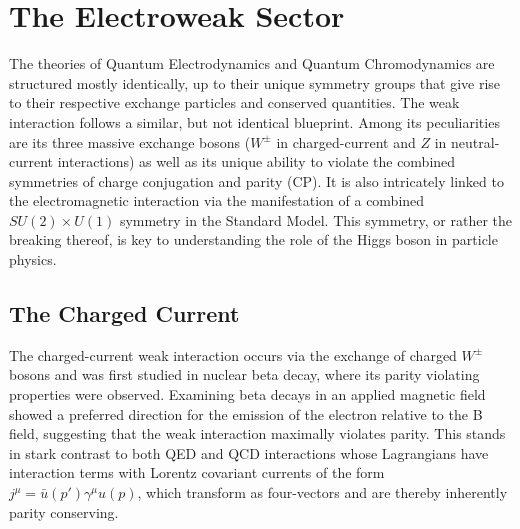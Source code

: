 \section{The Electroweak Sector}

The theories of Quantum Electrodynamics and Quantum Chromodynamics are structured mostly identically, up to their 
unique symmetry groups that give rise to their respective exchange particles and conserved quantities. The weak 
interaction follows a similar, but not identical blueprint. Among its peculiarities are its three massive exchange bosons 
($W^{\pm}$ in charged-current and $Z$ in neutral-current interactions) as well as its unique ability to violate the 
combined symmetries of charge conjugation and parity (CP). It is also intricately linked to the electromagnetic 
interaction via the manifestation of a combined $SU(2) \times U(1)$ symmetry in the Standard Model. This symmetry, 
or rather the breaking thereof, is key to understanding the role of the Higgs boson in particle physics. 

\subsection{The Charged Current}

The charged-current weak interaction occurs via the exchange of charged $W^{\pm}$ bosons and was first 
studied in nuclear beta decay, where its parity violating properties were observed. Examining beta decays in an 
applied magnetic field showed a preferred direction for the emission of the electron relative to the B field, 
suggesting that the weak interaction maximally violates parity. This stands in stark contrast to both QED and QCD 
interactions whose Lagrangians have interaction terms with Lorentz covariant currents of the form
$j^{\mu} = \bar{u}(p')\gamma^{\mu}u(p)$, which transform as four-vectors and are thereby inherently parity 
conserving. \par

